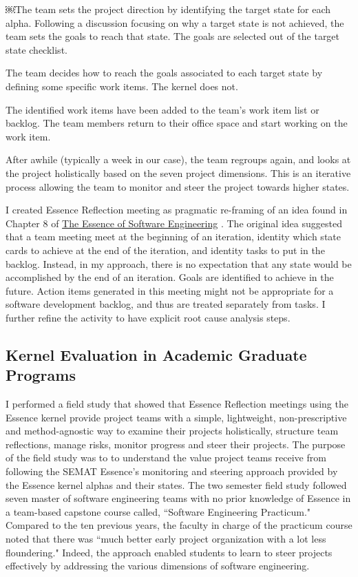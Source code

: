 \documentclass[preprint,12pt,3p]{elsarticle}
\begin{document}
￼The team sets the project direction by identifying the target state for each alpha. Following a discussion focusing on why a target state is not achieved, the team sets the goals to reach that state. The goals are selected out of the target state checklist.

The team decides how to reach the goals associated to each target state by defining some specific work items. The kernel does not.

The identified work items have been added to the team’s work item list or backlog. The team members return to their office space and start working on the work item. 

After awhile (typically a week in our case), the team regroups again, and looks at the project holistically based on the seven project dimensions. This is an iterative process allowing the team to monitor and steer the project towards higher states.

I created Essence Reflection meeting as pragmatic re-framing of an idea found in Chapter 8 of \underline{The Essence of Software Engineering} \cite{EssenceBook}. The original idea suggested that a team meeting meet at the beginning of an iteration, identity which state cards to achieve at the end of the iteration, and identity tasks to put in the backlog. Instead, in my approach, there is no expectation that any state would be accomplished by the end of an iteration. Goals are identified to achieve in the future. Action items generated in this meeting might not be appropriate for a software development backlog, and thus are treated separately from tasks. I further refine the activity to have explicit root cause analysis steps. 

\subsection{Kernel Evaluation in Academic Graduate Programs}
\label{CMUFieldStudy}
I performed a field study \cite{ICSE2014} that showed that Essence Reflection meetings \cite{EASE2014} using the Essence kernel provide project teams with a simple, lightweight, non-prescriptive and method-agnostic way to examine their projects holistically, structure team reflections, manage risks, monitor progress and steer their projects. The purpose of the field study was to to understand the value project teams receive from following the SEMAT Essence’s monitoring and steering approach provided by the Essence kernel alphas and their states. The two semester field study followed seven master of software engineering teams with no prior knowledge of Essence in a team-based capstone course called, ``Software Engineering Practicum." Compared to the ten previous years, the faculty in charge of the practicum course noted that there was ``much better early project organization with a lot less floundering." Indeed, the approach enabled students to learn to steer projects effectively by addressing the various dimensions of software engineering.
\end{document}
